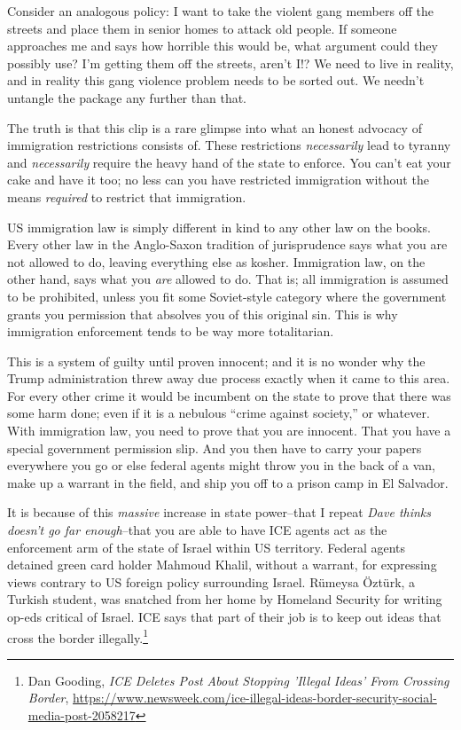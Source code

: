 \documentclass[11pt]{article}
\begin{document}
Consider an analogous policy: I want to take the violent gang members off the streets and place them in senior homes to attack old people. If someone approaches me and says how horrible this would be, what argument could they possibly use? I'm getting them off the streets, aren't I!? We need to live in reality, and in reality this gang violence problem needs to be sorted out. We needn't untangle the package any further than that.

The truth is that this clip is a rare glimpse into what an honest advocacy of immigration restrictions consists of. These restrictions \emph{necessarily} lead to tyranny and \emph{necessarily} require the heavy hand of the state to enforce. You can't eat your cake and have it too; no less can you have restricted immigration without the means \emph{required} to restrict that immigration.

US immigration law is simply different in kind to any other law on the books. Every other law in the Anglo-Saxon tradition of jurisprudence says what you are not allowed to do, leaving everything else as kosher. Immigration law, on the other hand, says what you \emph{are} allowed to do. That is; all immigration is assumed to be prohibited, unless you fit some Soviet-style category where the government grants you permission that absolves you of this original sin. This is why immigration enforcement tends to be way more totalitarian.

This is a system of guilty until proven innocent; and it is no wonder why the Trump administration threw away due process exactly when it came to this area. For every other crime it would be incumbent on the state to prove that there was some harm done; even if it is a nebulous ``crime against society,'' or whatever. With immigration law, you need to prove that you are innocent. That you have a special government permission slip. And you then have to carry your papers everywhere you go or else federal agents might throw you in the back of a van, make up a warrant in the field, and ship you off to a prison camp in El Salvador.

It is because of this \emph{massive} increase in state power--that I repeat \emph{Dave thinks doesn't go far enough}--that you are able to have ICE agents act as the enforcement arm of the state of Israel within US territory. Federal agents detained green card holder Mahmoud Khalil, without a warrant, for expressing views contrary to US foreign policy surrounding Israel. Rümeysa Öztürk, a Turkish student, was snatched from her home by Homeland Security for writing op-eds critical of Israel. ICE says that part of their job is to keep out ideas that cross the border illegally.\footnote{Dan Gooding, \emph{ICE Deletes Post About Stopping 'Illegal Ideas' From Crossing Border}, \url{https://www.newsweek.com/ice-illegal-ideas-border-security-social-media-post-2058217}}
\end{document}
